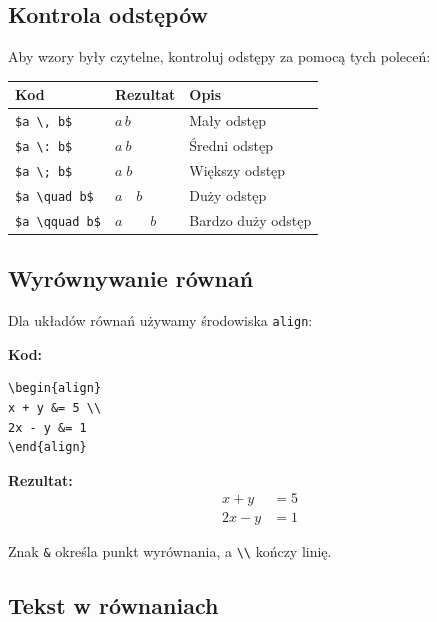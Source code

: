 \documentclass[
  polish,
  letterpaper,
  DIV=11,
  numbers=noendperiod]{scrreprt}
\begin{document}
\subsection{Kontrola odstępów}\label{kontrola-odstux119puxf3w}

Aby wzory były czytelne, kontroluj odstępy za pomocą tych poleceń:

\begin{longtable}[]{@{}lll@{}}
\toprule\noalign{}
Kod & Rezultat & Opis \\
\midrule\noalign{}
\endhead
\bottomrule\noalign{}
\endlastfoot
\texttt{\$a\ \textbackslash{},\ b\$} & \(a \, b\) & Mały odstęp \\
\texttt{\$a\ \textbackslash{}:\ b\$} & \(a \: b\) & Średni odstęp \\
\texttt{\$a\ \textbackslash{};\ b\$} & \(a \; b\) & Większy odstęp \\
\texttt{\$a\ \textbackslash{}quad\ b\$} & \(a \quad b\) & Duży odstęp \\
\texttt{\$a\ \textbackslash{}qquad\ b\$} & \(a \qquad b\) & Bardzo duży
odstęp \\
\end{longtable}

\subsection{Wyrównywanie równań}\label{wyruxf3wnywanie-ruxf3wnaux144}

Dla układów równań używamy środowiska \texttt{align}:

\textbf{Kod:}

\begin{verbatim}
\begin{align}
x + y &= 5 \\
2x - y &= 1
\end{align}
\end{verbatim}

\textbf{Rezultat:} \begin{align}
x + y &= 5 \\
2x - y &= 1
\end{align}

Znak \texttt{\&} określa punkt wyrównania, a
\texttt{\textbackslash{}\textbackslash{}} kończy linię.

\subsection{Tekst w równaniach}\label{tekst-w-ruxf3wnaniach}
\end{document}
